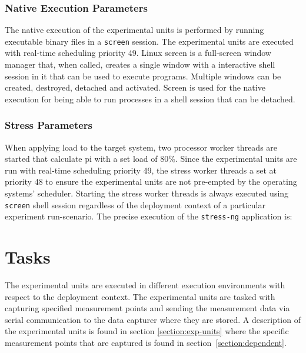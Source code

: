 \subsubsection{Native Execution Parameters} %
The native execution of the experimental units is performed by running executable binary files in a \texttt{screen} \cite{screen} session. The experimental units are executed with real-time scheduling priority 49. Linux screen is a full-screen window manager that, when called, creates a single window with a interactive shell session in it that can be used to execute programs. Multiple windows can be created, destroyed, detached and activated. Screen is used for the native execution for being able to run processes in a shell session that can be detached. 


\subsubsection{Stress Parameters}
When applying load to the target system, two processor worker threads are started that calculate pi with a set load of 80\%. Since the experimental units are run with real-time scheduling priority 49, the stress worker threads a set at priority 48 to ensure the experimental units are not pre-empted by the operating systems' scheduler. Starting the stress worker threads is always executed using \texttt{screen} shell session regardless of the deployment context of a particular experiment run-scenario. The precise execution of the \texttt{stress-ng} application is: \\

\begin{center}\end{center}



\section{Tasks}
The experimental units are executed in different execution environments with respect to the deployment context. The experimental units are tasked with capturing specified measurement points and sending the measurement data via serial communication to the data capturer where they are stored. A description of the experimental units is found in section \ref{section:exp-units} where the specific measurement points that are captured is found in section~\ref{section:dependent}.


